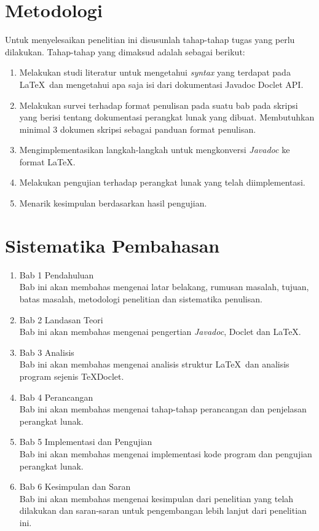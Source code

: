 \section{Metodologi}
\label{sec:metlit}
Untuk menyelesaikan penelitian ini disusunlah tahap-tahap tugas yang perlu dilakukan. Tahap-tahap yang dimaksud adalah sebagai berikut:
\begin{enumerate}
	\item Melakukan studi literatur untuk mengetahui {\it syntax} yang terdapat pada \LaTeX\ dan mengetahui apa saja isi dari dokumentasi Javadoc Doclet API.
	\item Melakukan survei terhadap format penulisan pada suatu bab pada skripsi yang berisi tentang dokumentasi perangkat lunak yang dibuat. Membutuhkan minimal 3 dokumen skripsi sebagai panduan format penulisan.
	\item Mengimplementasikan langkah-langkah untuk mengkonversi {\it Javadoc} ke format \LaTeX.
	\item Melakukan pengujian terhadap perangkat lunak yang telah diimplementasi.
	\item Menarik kesimpulan berdasarkan hasil pengujian.
\end{enumerate}

\section{Sistematika Pembahasan}
\label{sec:sispem}
\begin{enumerate}
	\item Bab 1 Pendahuluan\\
	Bab ini akan membahas mengenai latar belakang, rumusan masalah, tujuan, batas masalah, metodologi penelitian dan sistematika penulisan.
	\item Bab 2 Landasan Teori\\
	Bab ini akan membahas mengenai pengertian {\it Javadoc}, Doclet dan \LaTeX.
	\item Bab 3 Analisis\\
	Bab ini akan membahas mengenai analisis struktur \LaTeX\ dan analisis program sejenis TeXDoclet.
	\item Bab 4 Perancangan\\
	Bab ini akan membahas mengenai tahap-tahap perancangan dan penjelasan perangkat lunak.
	\item Bab 5 Implementasi dan Pengujian\\
	Bab ini akan membahas mengenai implementasi kode program dan pengujian perangkat lunak.
	\item Bab 6 Kesimpulan dan Saran\\
	Bab ini akan membahas mengenai kesimpulan dari penelitian yang telah dilakukan dan saran-saran untuk pengembangan lebih lanjut dari penelitian ini.
\end{enumerate}
















